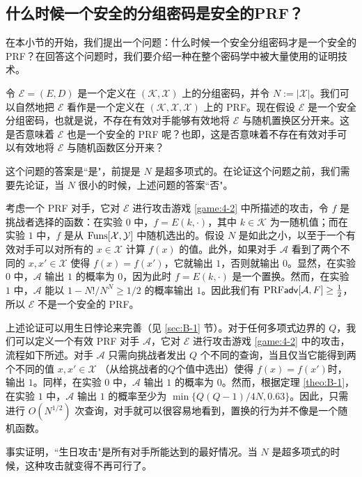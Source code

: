 \subsection{什么时候一个安全的分组密码是安全的PRF？}

在本小节的开始，我们提出一个问题：什么时候一个安全分组密码才是一个安全的 PRF？在回答这个问题时，我们要介绍一种在整个密码学中被大量使用的证明技术。

令 $\mathcal{E}=(E,D)$ 是一个定义在 $(\mathcal{K},\mathcal{X})$ 上的分组密码，并令 $N:=|\mathcal{X}|$。我们可以自然地把 $\mathcal{E}$ 看作是一个定义在 $(\mathcal{K},\mathcal{X},\mathcal{X})$ 上的 PRF。现在假设 $\mathcal{E}$ 是一个安全分组密码，也就是说，不存在有效对手能够有效地将 $\mathcal{E}$ 与随机置换区分开来。这是否意味着 $\mathcal{E}$ 也是一个安全的 PRF 呢？也即，这是否意味着不存在有效对手可以有效地将 $\mathcal{E}$ 与随机函数区分开来？

这个问题的答案是``是"，前提是 $N$ 是超多项式的。在论证这个问题之前，我们需要先论证，当 $N$ 很小的时候，上述问题的答案``否"。

考虑一个 PRF 对手，它对 $\mathcal{E}$ 进行攻击游戏 \ref{game:4-2} 中所描述的攻击，令 $f$ 是挑战者选择的函数：在实验 $0$ 中，$f=E(k,\cdot)$，其中 $k\in\mathcal{K}$ 为一随机值；而在实验 $1$ 中，$f$ 是从 ${\rm Funs}[\mathcal{X},\mathcal{Y}]$ 中随机选出的。假设 $N$ 是如此之小，以至于一个有效对手可以对所有的 $x\in\mathcal{X}$ 计算 $f(x)$ 的值。此外，如果对手 $\mathcal{A}$ 看到了两个不同的 $x,x'\in\mathcal{X}$ 使得 $f(x)=f(x')$，它就输出 $1$，否则就输出 $0$。显然，在实验 $0$ 中，$\mathcal{A}$ 输出 $1$ 的概率为 $0$，因为此时 $f=E(k,\cdot)$ 是一个置换。然而，在实验 $1$ 中，$\mathcal{A}$ 能以 $1-{N!}/{N^N}\geq{1}/{2}$ 的概率输出 $1$。因此我们有 ${\rm PRF\mathsf{adv}}[\mathcal{A}, F]\geq\frac{1}{2}$，所以 $\mathcal{E}$ 不是一个安全的 PRF。

上述论证可以用生日悖论来完善（见 \ref{sec:B-1} 节）。对于任何多项式边界的 $Q$，我们可以定义一个有效 PRF 对手 $\mathcal{A}$，它对 $\mathcal{E}$ 进行攻击游戏 \ref{game:4-2} 中的攻击，流程如下所述。对手 $\mathcal{A}$ 只需向挑战者发出 $Q$ 个不同的查询，当且仅当它能得到两个不同的值 $x,x'\in\mathcal{X}$ （从给挑战者的$Q$个值中选出）使得 $f(x)=f(x')$时，输出 $1$。同样，在实验 $0$ 中，$\mathcal{A}$ 输出 $1$ 的概率为 $0$。然而，根据定理 \ref{theo:B-1}，在实验 $1$ 中，$\mathcal{A}$ 输出 $1$ 的概率至少为 $\min\{{Q(Q-1)}/{4N},0.63\}$。因此，只需进行 $O(N^{1/2})$ 次查询，对手就可以很容易地看到，置换的行为并不像是一个随机函数。

事实证明，``生日攻击"是所有对手所能达到的最好情况。当 $N$ 是超多项式的时候，这种攻击就变得不再可行了。

